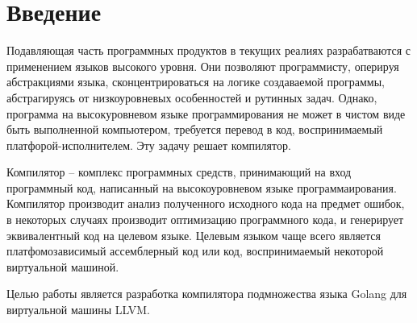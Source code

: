 \section*{Введение}

Подавляющая часть программных продуктов в текущих реалиях разрабатваются
с применением языков высокого уровня.
Они позволяют программисту, оперируя абстракциями языка, сконцентрироваться на логике создаваемой
программы, абстрагируясь от низкоуровневых особенностей и рутинных задач.
Однако, программа на высокуровневом языке программирования не может в чистом
виде быть выполненной компьютером, требуется перевод в код, воспринимаемый
платфорой-исполнителем. Эту задачу решает компилятор.

Компилятор -- комплекс программных средств, принимающий на вход программный код,
написанный на высокоуровневом языке программаирования. Компилятор производит
анализ полученного исходного кода на предмет ошибок, в некоторых случаях производит
оптимизацию программного кода, и генерирует эквивалентный код на целевом языке.
Целевым языком чаще всего является платфомозависимый ассемблерный код или код,
воспринимаемый некоторой виртуальной машиной.

Целью работы является разработка компилятора подмножества языка Golang для
виртуальной машины LLVM.